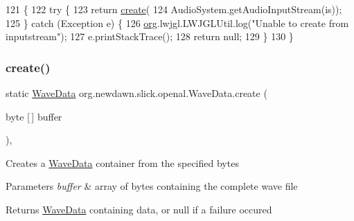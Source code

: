 \begin{DoxyCode}
121                                                   \{
122         \textcolor{keywordflow}{try} \{
123             \textcolor{keywordflow}{return} \mbox{\hyperlink{classorg_1_1newdawn_1_1slick_1_1openal_1_1_wave_data_a8848866627bc92b5a94a59b800e8627c}{create}}(
124                 AudioSystem.getAudioInputStream(is));
125         \} \textcolor{keywordflow}{catch} (Exception e) \{
126             \mbox{\hyperlink{namespaceorg}{org}}.lwjgl.LWJGLUtil.log(\textcolor{stringliteral}{"Unable to create from inputstream"});
127             e.printStackTrace();
128             \textcolor{keywordflow}{return} null;
129         \}       
130     \}   
\end{DoxyCode}
\mbox{\label{classorg_1_1newdawn_1_1slick_1_1openal_1_1_wave_data_a2f465ca84f571b349028e16876182d82}} 
\subsubsection{\texorpdfstring{create()}{create()}\hspace{0.1cm}{\footnotesize\ttfamily [4/6]}}
{\footnotesize\ttfamily static \mbox{\hyperlink{classorg_1_1newdawn_1_1slick_1_1openal_1_1_wave_data}{Wave\+Data}} org.\+newdawn.\+slick.\+openal.\+Wave\+Data.\+create (\begin{DoxyParamCaption}\item[{byte \mbox{[}$\,$\mbox{]}}]{buffer }\end{DoxyParamCaption})\hspace{0.3cm}{\ttfamily [inline]}, {\ttfamily [static]}}

Creates a \mbox{\hyperlink{classorg_1_1newdawn_1_1slick_1_1openal_1_1_wave_data}{Wave\+Data}} container from the specified bytes


\begin{DoxyParams}{Parameters}
{\em buffer} & array of bytes containing the complete wave file \\
\hline
\end{DoxyParams}
\begin{DoxyReturn}{Returns}
\mbox{\hyperlink{classorg_1_1newdawn_1_1slick_1_1openal_1_1_wave_data}{Wave\+Data}} containing data, or null if a failure occured 
\end{DoxyReturn}

